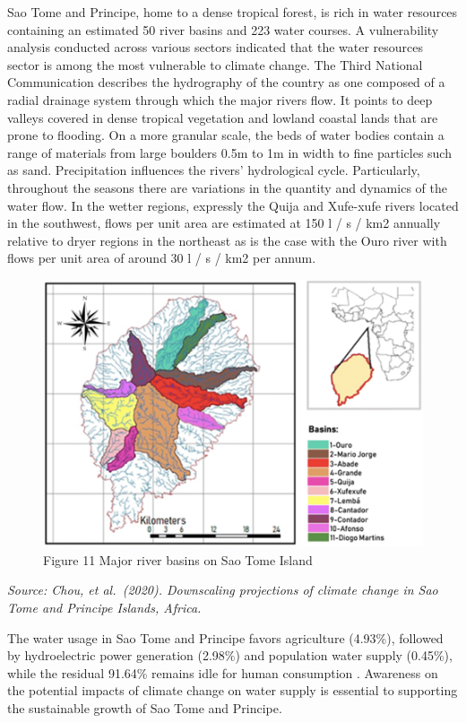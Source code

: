 \documentclass[
]{book}
\begin{document}
Sao Tome and Principe, home to a dense tropical forest, is rich in water resources containing an estimated 50 river basins and 223 water courses. A vulnerability analysis conducted across various sectors indicated that the water resources sector is among the most vulnerable to climate change. The Third National Communication describes the hydrography of the country as one composed of a radial drainage system through which the major rivers flow. It points to deep valleys covered in dense tropical vegetation and lowland coastal lands that are prone to flooding. On a more granular scale, the beds of water bodies contain a range of materials from large boulders 0.5m to 1m in width to fine particles such as sand. Precipitation influences the rivers' hydrological cycle. Particularly, throughout the seasons there are variations in the quantity and dynamics of the water flow. In the wetter regions, expressly the Quija and Xufe-xufe rivers located in the southwest, flows per unit area are estimated at 150 l / s / km2 annually relative to dryer regions in the northeast as is the case with the Ouro river with flows per unit area of around 30 l / s / km2 per annum.

\begin{figure}
\centering
\includegraphics{images/river_basins.png}
\caption{Figure 11 Major river basins on Sao Tome Island}
\end{figure}

\emph{Source: Chou, et al.~(2020). Downscaling projections of climate change in Sao Tome and Principe Islands, Africa.}

The water usage in Sao Tome and Principe favors agriculture (4.93\%), followed by hydroelectric power generation (2.98\%) and population water supply (0.45\%), while the residual 91.64\% remains idle for human consumption . Awareness on the potential impacts of climate change on water supply is essential to supporting the sustainable growth of Sao Tome and Principe.
\end{document}
